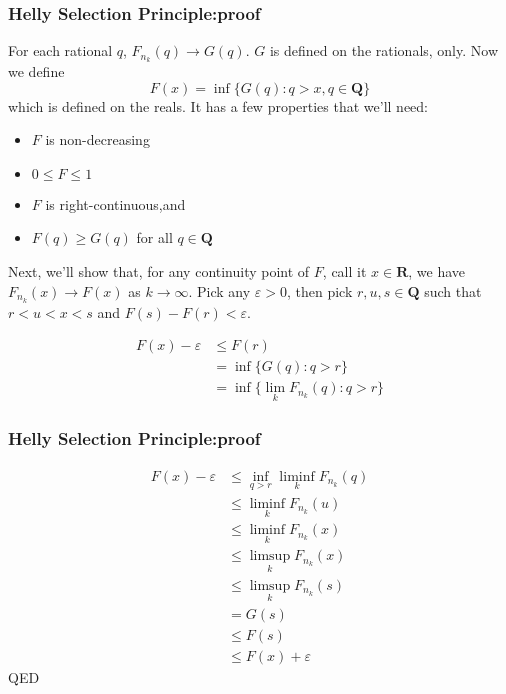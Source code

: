 \documentclass[handout]{beamer}
\begin{document}
\frame
{
\frametitle{Helly Selection Principle:proof} 

For each rational $q$, $F_{n_k}(q) \to  G(q)$. $G$ is defined on the rationals, only. Now we define 
$$
F(x) = \inf\{ G(q) : q > x, q \in \mathbf{Q} \}
$$
which is defined on the reals. It has a few properties that we'll need:

\begin{itemize}
\item $F$ is non-decreasing
\item $0 \le F \le 1$
\item $F$ is right-continuous,and
\item $F(q) \ge G(q)$ for all $q \in \mathbf{Q}$
\end{itemize}

Next, we'll show that, for any continuity point of $F$, call it $x \in \mathbf{R}$, we have $F_{n_k}(x) \to F(x)$ as $k \to \infty$. Pick any $\varepsilon > 0$, then pick $r,u,s \in \mathbf{Q}$ such that $r < u < x < s$ and $F(s) - F(r) < \varepsilon$.

\begin{align*}
F(x) - \varepsilon &\le F(r) \\
&= \inf\{ G(q) : q > r\} \\
&= \inf\{ \lim_{k} F_{n_k}(q) : q > r\} 
\end{align*}
}


\frame
{
\frametitle{Helly Selection Principle:proof} 


\begin{align*}
F(x) - \varepsilon &\le \inf_{q > r} \liminf_{k} F_{n_k}(q) \\
&\le \liminf_{k} F_{n_k}(u) \tag{$u > r$} \\
&\le \liminf_{k} F_{n_k}(x) \tag{$x > u$ } \\
&\le \limsup_{k} F_{n_k}(x)  \\
&\le \limsup_{k} F_{n_k}(s) \tag{$s > x$ } \\
&= G(s) \\
&\le F(s) \\
&\le F(x) + \varepsilon 
\end{align*}
QED
}
\end{document}

